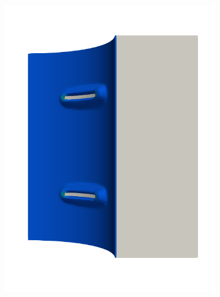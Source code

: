 \begin{frame}
\begin{columns}[T]
\begin{column}{0.6\textwidth}
\begin{figure}
{\begin{subfigure}{0.19\textwidth}
            \includegraphics[width=\textwidth]{Chapter345/figures/seed_ep_2}
          \end{subfigure}
        }
        

\end{figure}
\end{column}
\end{columns}
\end{frame}
